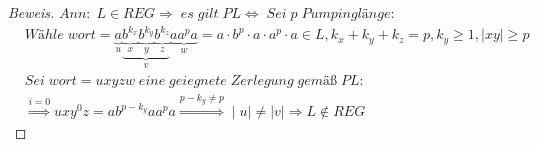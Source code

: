 \begin{proof}[Beweis]
	\begin{math}
		Ann:\;L\in REG\Rightarrow\;es\;gilt\;PL\Leftrightarrow\;Sei\;p\;Pumpinglänge:
	\end{math}
	\begin{align*}
		&Wähle\;wort=\underbrace{a}_u
		\underbrace{
			\underbrace{b^{k_x}}_x
			\underbrace{b^{k_y}}_y
			\underbrace{b^{k_z}}_z
		}_v
		\underbrace{aa^pa}_w=a\cdot b^p\cdot a\cdot a^p\cdot a\in L
		,k_x+k_y+k_z=p,k_y\ge1,\mid xy\mid\ge p\\
		&Sei\;wort=uxyzw\;eine\;geiegnete\;Zerlegung\;gemäß\;PL:\\
		&\overset{i=0}{\Longrightarrow}uxy^0z=ab^{p-k_y}aa^pa\overset{p-k_y\neq p}{\Longrightarrow}\mid u\mid\neq\mid v\mid\Rightarrow L\notin REG
	\end{align*}
\end{proof}
